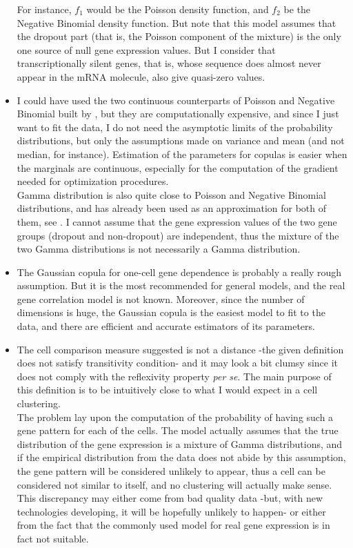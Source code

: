 \documentclass{report}
\begin{document}
\begin{itemize}
For instance, $f_1$ would be the Poisson density function, and $f_2$ be the Negative Binomial density function. But note that this model assumes that the dropout part (that is, the Poisson component of the mixture) is the only one source of null gene expression values. But I consider that transcriptionally silent genes, that is, whose sequence does almost never appear in the mRNA molecule, also give quasi-zero values\cite{kharchenko2014bayesian}. 

\item I could have used the two continuous counterparts of Poisson and Negative Binomial built by \cite{ilienko2013continuous}\cite{chandra2012continuous}\cite{abid2016continuous}, but they are computationally expensive, and since I just want to fit the data, I do not need the asymptotic limits of the probability distributions, but only the assumptions made on variance and mean (and not median, for instance). Estimation of the parameters for copulas is easier when the marginals are continuous, especially for the computation of the gradient needed for optimization procedures.\\

Gamma distribution is also quite close to Poisson and Negative Binomial distributions, and has already been used as an approximation for both of them, see \cite{best1974improved}\cite{guenther1972simple}. I cannot assume that the gene expression values of the two gene groups (dropout and non-dropout) are independent, thus the mixture of the two Gamma distributions is not necessarily a Gamma distribution.

\item The Gaussian copula for one-cell gene dependence is probably a really rough assumption. But it is the most recommended for general models\cite{inouye2017review}, and the real gene correlation model is not known. Moreover, since the number of dimensions is huge, the Gaussian copula is the easiest model to fit to the data, and there are efficient and accurate estimators of its parameters. 

\item The cell comparison measure suggested is not a distance -the given definition does not satisfy transitivity condition- and it may look a bit clumsy since it does not comply with the reflexivity property \emph{per se}. The main purpose of this definition is to be intuitively close to what I would expect in a cell clustering.\\

The problem lay upon the computation of the probability of having such a gene pattern for each of the cells. The model actually assumes that the true distribution of the gene expression is a mixture of Gamma distributions, and if the empirical distribution from the data does not abide by this assumption, the gene pattern will be considered unlikely to appear, thus a cell can be considered not similar to itself, and no clustering will actually make sense. This discrepancy may either come from bad quality data -but, with new technologies developing, it will be hopefully unlikely to happen- or either from the fact that the commonly used model for real gene expression is in fact not suitable.\\


\end{itemize}
\end{document}
